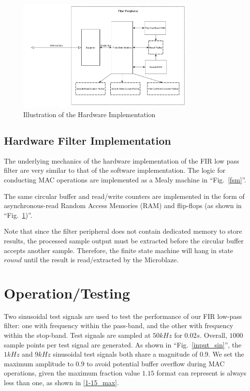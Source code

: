\documentclass[conference]{IEEEtran}
\begin{document}
\begin{figure}[htbp]
    \centerline{\includegraphics[width=0.8\textwidth]{Figures/Filter/hardware_architecture.jpg}}
    \caption{Illustration of the Hardware Implementation}
    \label{hardware}
\end{figure}

\subsection{Hardware Filter Implementation} \label{hardware_imp}
The underlying mechanics of the hardware implementation of the FIR low pass filter are very similar to that of the software implementation. The logic for conducting MAC operations are implemented as a Mealy machine in ``Fig.~\ref{fsm}''.

The same circular buffer and read/write counters are implemented in the form of asynchronous-read Random Access Memories (RAM) and flip-flops (as shown in ``Fig.~\ref{hardware})''. 

Note that since the filter peripheral does not contain dedicated memory to store results, the processed sample output must be extracted before the circular buffer accepts another sample. Therefore, the finite state machine will hang in state $round$ until the result is read/extracted by the Microblaze\textregistered{}.



\section{Operation/Testing} \label{testing}

Two sinusoidal test signals are used to test the performance of our FIR low-pass filter: one with frequency within the pass-band, and the other with frequency within the stop-band. Test signals are sampled at $50kHz$ for $0.02s$. Overall, $1000$ sample points per test signal are generated. As shown in ``Fig.~\ref{input_sin}'', the $1kHz$ and $9kHz$ sinusoidal test signals both share a magnitude of $0.9$. We set the maximum amplitude to $0.9$ to avoid potential buffer overflow during MAC operations, given the maximum fraction value $1.15$ format can represent is always less than one, as shown in \eqref{1-15_max}.
\end{document}
